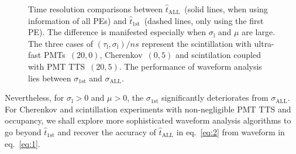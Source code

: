 \begin{figure}[H]
  \centering
  \resizebox{0.8\textwidth}{!}{}
  \caption{\label{fig:reso-diff} Time resolution comparisons between $\hat{t}_{\mathrm{ALL}}$~(solid lines, when using information of all PEs) and $\hat{t}_\mathrm{1st}$~(dashed lines, only using the first PE). The difference is manifested especially when $\sigma_\mathrm{l}$ and $\mu$ are large. The three cases of $(\tau_\mathrm{l}, \sigma_\mathrm{l})/\si{ns}$ represent the scintillation with ultra-fast PMTs~$(20, 0)$, Cherenkov~$(0, 5)$ and scintilation coupled with PMT TTS~$(20, 5)$. The performance of waveform analysis lies between $\sigma_{\mathrm{1st}}$ and $\sigma_{\mathrm{ALL}}$. }
\end{figure}

Nevertheless, for $\sigma_\mathrm{l} > 0$ and $\mu >0$, the $\sigma_{\mathrm{1st}}$ significantly deteriorates from $\sigma_{\mathrm{ALL}}$.  For Cherenkov and scintillation experiments with non-negligible PMT TTS and occupancy, we shall explore more sophisticated waveform analysis algorithms to go beyond $\hat{t}_{\mathrm{1st}}$ and recover the accuracy of $\hat{t}_\mathrm{ALL}$ in eq.~\eqref{eq:2} from waveform in eq.~\eqref{eq:1}.
